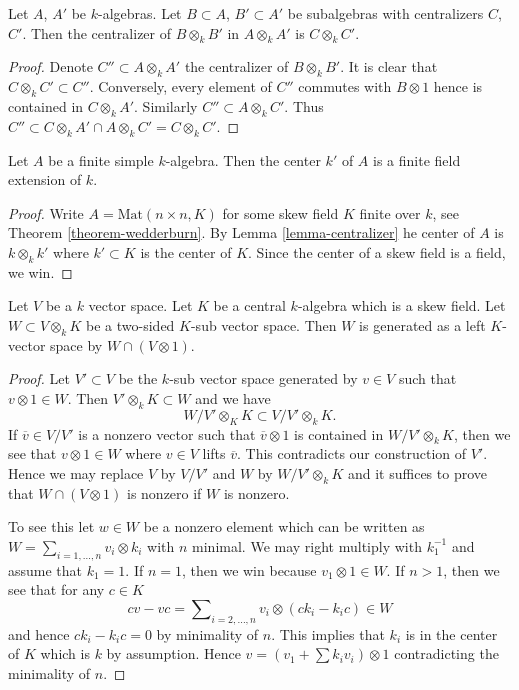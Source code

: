 \begin{lemma}
\label{lemma-centralizer}
Let $A$, $A'$ be $k$-algebras. Let $B \subset A$, $B' \subset A'$ be
subalgebras with centralizers $C$, $C'$. Then the centralizer of
$B \otimes_k B'$ in $A \otimes_k A'$ is $C \otimes_k C'$.
\end{lemma}

\begin{proof}
Denote $C'' \subset A \otimes_k A'$ the centralizer of $B \otimes_k B'$.
It is clear that $C \otimes_k C' \subset C''$. Conversely, every element
of $C''$ commutes with $B \otimes 1$ hence is contained in $C \otimes_k A'$.
Similarly $C'' \subset A \otimes_k C'$. Thus
$C'' \subset C \otimes_k A' \cap A \otimes_k C' = C \otimes_k C'$.
\end{proof}

\begin{lemma}
\label{lemma-center-csa}
Let $A$ be a finite simple $k$-algebra. Then the center $k'$ of $A$
is a finite field extension of $k$.
\end{lemma}

\begin{proof}
Write $A = \text{Mat}(n \times n, K)$ for some skew field $K$ finite
over $k$, see
Theorem \ref{theorem-wedderburn}.
By
Lemma \ref{lemma-centralizer}
he center of $A$ is $k \otimes_k k'$ where $k' \subset K$ is the
center of $K$. Since the center of a skew field is a field, we win.
\end{proof}

\begin{lemma}
\label{lemma-generate-two-sided-sub}
Let $V$ be a $k$ vector space. Let $K$ be a central $k$-algebra
which is a skew field. Let $W \subset V \otimes_k K$ be a two-sided
$K$-sub vector space. Then $W$ is generated as a left $K$-vector
space by $W \cap (V \otimes 1)$.
\end{lemma}

\begin{proof}
Let $V' \subset V$ be the $k$-sub vector space generated by $v \in V$
such that $v \otimes 1 \in W$. Then $V' \otimes_k K \subset W$ and
we have
$$
W/V' \otimes_K K  \subset  V/V' \otimes_k K.
$$
If $\overline{v} \in V/V'$ is a nonzero vector such that
$\overline{v} \otimes 1$ is contained in $W/V' \otimes_k K$,
then we see that $v \otimes 1 \in W$ where $v \in V$ lifts $\overline{v}$.
This contradicts our construction of $V'$. Hence we may replace
$V$ by $V/V'$ and $W$ by $W/V' \otimes_k K$ and it suffices to prove
that $W \cap (V \otimes 1)$ is nonzero if $W$ is nonzero.

\medskip\noindent
To see this let $w \in W$ be a nonzero element which can be written
as $W = \sum_{i = 1, \ldots, n} v_i \otimes k_i$ with $n$ minimal.
We may right multiply with $k_1^{-1}$ and assume that $k_1 = 1$.
If $n = 1$, then we win because $v_1 \otimes 1 \in W$.
If $n > 1$, then we see that for any $c \in K$
$$
c v - v c = \sum\nolimits_{i = 2, \ldots, n} v_i \otimes (c k_i - k_i c) \in W
$$
and hence $c k_i - k_i c = 0$ by minimality of $n$.
This implies that $k_i$ is in the center of $K$ which is $k$ by
assumption. Hence $v = (v_1 + \sum k_i v_i) \otimes 1$ contradicting
the minimality of $n$.
\end{proof}

